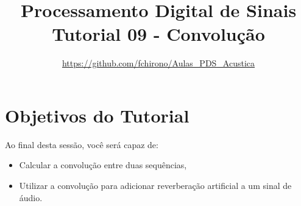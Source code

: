 \documentclass[a4paper,twoside,12pt]{article}
\title{\vspace{-2cm} Processamento Digital de Sinais\\ Tutorial 09 - Convolução}
\author{\url{https://github.com/fchirono/Aulas_PDS_Acustica}}
\begin{document}
	\date{}
	\maketitle
	
	\section*{Objetivos do Tutorial}
	Ao final desta sessão, você será capaz de:
	\begin{itemize}
		\item Calcular a convolução entre duas sequências,
		\item Utilizar a convolução para adicionar reverberação artificial a um sinal de áudio.
	\end{itemize}
	
	\begingroup
	\let\clearpage\relax
	\tableofcontents
	\endgroup
	
	
	
	

	
\end{document}
